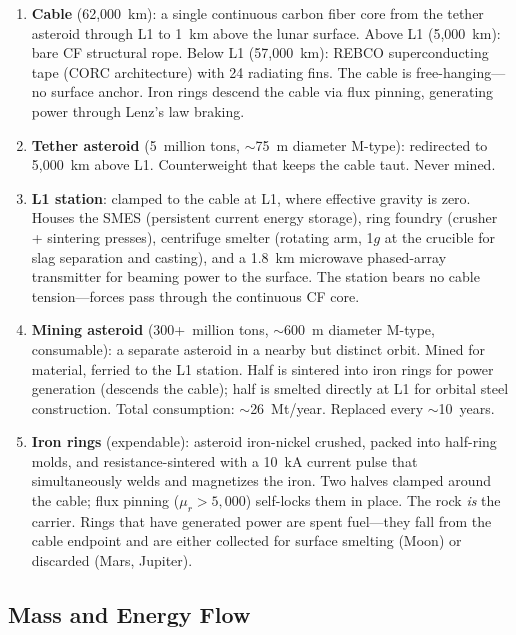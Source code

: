 \documentclass[12pt,letterpaper]{article}
\begin{document}
\begin{enumerate}[label=\arabic*.]
\item \textbf{Cable} (62{,}000~km): a single continuous carbon fiber core from the tether asteroid through L1 to 1~km above the lunar surface. Above L1 (5{,}000~km): bare CF structural rope. Below L1 (57{,}000~km): REBCO superconducting tape (CORC architecture) with 24 radiating fins. The cable is free-hanging---no surface anchor. Iron rings descend the cable via flux pinning, generating power through Lenz's law braking.

\item \textbf{Tether asteroid} (5~million tons, ${\sim}$75~m diameter M-type): redirected to 5{,}000~km above L1. Counterweight that keeps the cable taut. Never mined.

\item \textbf{L1 station}: clamped to the cable at L1, where effective gravity is zero. Houses the SMES (persistent current energy storage), ring foundry (crusher + sintering presses), centrifuge smelter (rotating arm, 1$g$ at the crucible for slag separation and casting), and a 1.8~km microwave phased-array transmitter for beaming power to the surface. The station bears no cable tension---forces pass through the continuous CF core.

\item \textbf{Mining asteroid} (300+~million tons, ${\sim}$600~m diameter M-type, consumable): a separate asteroid in a nearby but distinct orbit. Mined for material, ferried to the L1 station. Half is sintered into iron rings for power generation (descends the cable); half is smelted directly at L1 for orbital steel construction. Total consumption: ${\sim}$26~Mt/year. Replaced every ${\sim}$10~years.

\item \textbf{Iron rings} (expendable): asteroid iron-nickel crushed, packed into half-ring molds, and resistance-sintered with a 10~kA current pulse that simultaneously welds and magnetizes the iron. Two halves clamped around the cable; flux pinning ($\mu_r > 5{,}000$) self-locks them in place. The rock \emph{is} the carrier. Rings that have generated power are spent fuel---they fall from the cable endpoint and are either collected for surface smelting (Moon) or discarded (Mars, Jupiter).
\end{enumerate}

\subsection{Mass and Energy Flow}
\end{document}
